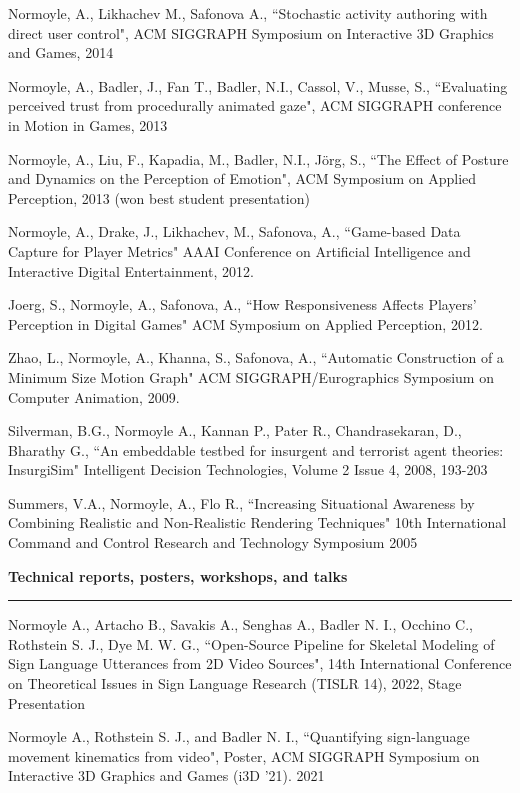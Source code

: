 Normoyle, A., Likhachev M., Safonova A., ``Stochastic activity authoring with direct user control", 
ACM SIGGRAPH Symposium on Interactive 3D Graphics and Games, 2014 

Normoyle, A., Badler, J., Fan T., Badler, N.I., Cassol, V., Musse, S., ``Evaluating perceived trust from procedurally animated gaze", ACM SIGGRAPH conference in Motion in Games, 2013 

Normoyle, A., Liu, F., Kapadia, M., Badler, N.I., J\"{o}rg, S., ``The Effect of Posture and Dynamics on the Perception of Emotion", ACM Symposium on Applied Perception, 2013 (won best student presentation)

Normoyle, A., Drake, J., Likhachev, M., Safonova, A., ``Game-based Data Capture for Player Metrics" 
AAAI Conference on Artificial Intelligence and Interactive Digital Entertainment, 2012.

Joerg, S., Normoyle, A., Safonova, A., ``How Responsiveness Affects Players' Perception in Digital Games" 
ACM Symposium on Applied Perception, 2012.

Zhao, L., Normoyle, A., Khanna, S., Safonova, A., ``Automatic Construction of a Minimum Size Motion Graph" ACM SIGGRAPH/Eurographics Symposium on Computer Animation, 2009.

Silverman, B.G., Normoyle A., Kannan P., Pater R., Chandrasekaran, D., Bharathy G., ``An embeddable testbed for insurgent and terrorist agent theories: InsurgiSim" Intelligent Decision Technologies, Volume 2 Issue 4, 2008, 193-203

Summers, V.A., Normoyle, A., Flo R., ``Increasing Situational Awareness by Combining Realistic and Non-Realistic Rendering Techniques" 10th International Command and Control Research and Technology Symposium 2005

\medskip
\medskip

{\Large {\bf  Technical reports, posters, workshops, and talks}}
\vspace{0.1cm}
\hrule
\medskip

Normoyle A., Artacho B., Savakis A., Senghas A., Badler N. I., Occhino C., Rothstein S. J., Dye M. W. G., ``Open-Source Pipeline for Skeletal Modeling of Sign Language Utterances 
from 2D Video Sources", 14th International Conference on Theoretical Issues in Sign Language Research (TISLR 14), 2022, Stage Presentation

Normoyle A., Rothstein S. J., and Badler N. I., ``Quantifying sign-language movement kinematics from video", Poster, ACM SIGGRAPH Symposium on Interactive
3D Graphics and Games (i3D ’21). 2021

